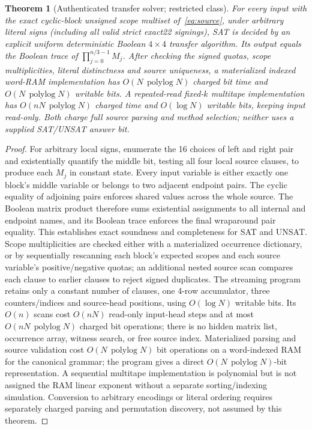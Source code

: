 \documentclass[10pt]{article}
\newtheorem{theorem}{Theorem}
\begin{document}
\begin{theorem}[Authenticated transfer solver; restricted class]\label{thm:transfer}
For every input with the exact cyclic-block \emph{unsigned scope multiset} of~\eqref{eq:source}, under arbitrary literal signs (including all valid strict exact22 signings), SAT is decided by an explicit uniform deterministic Boolean $4\times4$ transfer algorithm. Its output equals the Boolean trace of $\prod_{j=0}^{n/3-1} M_j$. After checking the signed quotas, scope multiplicities, literal distinctness and source uniqueness, a materialized indexed word-RAM implementation has $O(N\,\operatorname{polylog}N)$ charged bit time and $O(N\,\operatorname{polylog}N)$ writable bits. A repeated-read fixed-$k$ multitape implementation has $O(nN\,\operatorname{polylog}N)$ charged time and $O(\log N)$ writable bits, keeping input read-only. Both charge full source parsing and method selection; neither uses a supplied SAT/UNSAT answer bit.
\end{theorem}
\begin{proof}
For arbitrary local signs, enumerate the 16 choices of left and right pair and existentially quantify the middle bit, testing all four local source clauses, to produce each $M_j$ in constant state. Every input variable is either exactly one block's middle variable or belongs to two adjacent endpoint pairs. The cyclic equality of adjoining pairs enforces shared values across the whole source. The Boolean matrix product therefore sums existential assignments to all internal and endpoint names, and its Boolean trace enforces the final wraparound pair equality. This establishes exact soundness and completeness for SAT and UNSAT. Scope multiplicities are checked either with a materialized occurrence dictionary, or by sequentially rescanning each block's expected scopes and each source variable's positive/negative quotas; an additional nested source scan compares each clause to earlier clauses to reject signed duplicates. The streaming program retains only a constant number of clauses, one 4-row accumulator, three counters/indices and source-head positions, using $O(\log N)$ writable bits. Its $O(n)$ scans cost $O(nN)$ read-only input-head steps and at most $O(nN\,\operatorname{polylog}N)$ charged bit operations; there is no hidden matrix list, occurrence array, witness search, or free source index. Materialized parsing and source validation cost $O(N\,\operatorname{polylog}N)$ bit operations on a word-indexed RAM for the canonical grammar; the program gives a direct $O(N\,\operatorname{polylog}N)$-bit representation. A sequential multitape implementation is polynomial but is not assigned the RAM linear exponent without a separate sorting/indexing simulation. Conversion to arbitrary encodings or literal ordering requires separately charged parsing and permutation discovery, not assumed by this theorem.
\end{proof}
\end{document}
